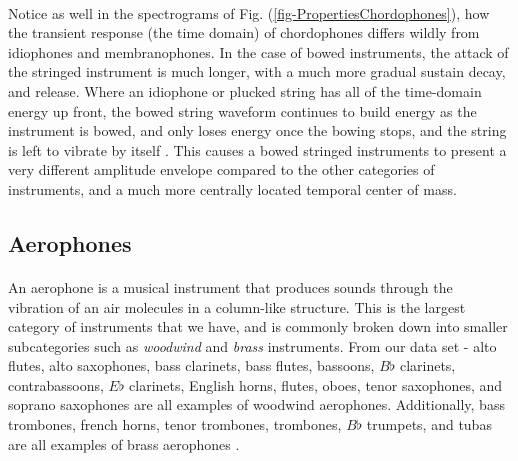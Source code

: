 \documentclass[12pt,letterpaper]{article}
\begin{document}
\paragraph*{}Notice as well in the spectrograms of Fig. (\ref{fig-PropertiesChordophones}), how the transient response (the time domain) of chordophones differs wildly from idiophones and membranophones. In the case of bowed instruments, the attack of the stringed instrument is much longer, with a much more gradual sustain decay, and release. Where an idiophone or plucked string has all of the time-domain energy up front, the bowed string waveform continues to build energy as the instrument is bowed, and only loses energy once the bowing stops, and the string is left to vibrate by itself \cite{Hunter}. This causes a bowed stringed instruments to present a very different amplitude envelope compared to the other categories of instruments, and a much more centrally located temporal center of mass.


\subsection{Aerophones}
\label{subsec-Aerophones}

\paragraph*{}An aerophone is a musical instrument that produces sounds through the vibration of an air molecules in a column-like structure. This is the largest category of instruments that we have, and is commonly broken down into smaller subcategories such as \textit{woodwind} and \textit{brass} instruments. From our data set - alto flutes, alto saxophones, bass clarinets, bass flutes, bassoons, $B\flat$ clarinets, contrabassoons, $E\flat$ clarinets, English horns, flutes, oboes, tenor saxophones, and soprano saxophones are all examples of woodwind aerophones. Additionally, bass trombones, french horns, tenor trombones, trombones, $B\flat$ trumpets, and tubas are all examples of brass aerophones \cite{Hornbostel,Olson,White}.
\end{document}
